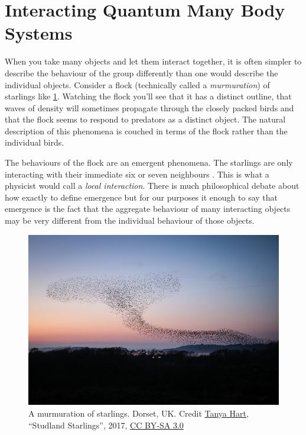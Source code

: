 \hypertarget{interacting-quantum-many-body-systems}{%
\section{Interacting Quantum Many Body Systems}\label{interacting-quantum-many-body-systems}}

When you take many objects and let them interact together, it is often simpler to describe the behaviour of the group differently than one would describe the individual objects. Consider a flock (technically called a \emph{murmuration}) of starlings like \cref{fig:Studland_Starlings}. Watching the flock you'll see that it has a distinct outline, that waves of density will sometimes propagate through the closely packed birds and that the flock seems to respond to predators as a distinct object. The natural description of this phenomena is couched in terms of the flock rather than the individual birds.

The behaviours of the flock are an emergent phenomena. The starlings are only interacting with their immediate six or seven neighbours \autocite{king2012murmurations,balleriniInteractionRulingAnimal2008}. This is what a physicist would call a \emph{local interaction}. There is much philosophical debate about how exactly to define emergence \autocite{andersonMoreDifferent1972,kivelsonDefiningEmergencePhysics2016} but for our purposes it enough to say that emergence is the fact that the aggregate behaviour of many interacting objects may be very different from the individual behaviour of those objects.

\hypertarget{fig:Studland_Starlings}{%
\begin{figure}
\centering
\includegraphics[width=1\textwidth,height=\textheight]{figure_code/intro_chapter/Studland_Starlings.jpeg}
\caption[{A murmuration of Starlings}]{A murmuration of starlings. Dorset, UK. Credit \href{twitter.com/arripay}{Tanya Hart}, ``Studland Starlings'', 2017, \href{creativecommons.org/licenses/by-sa/3.0/deed.en}{CC BY-SA 3.0}}
\label{fig:Studland_Starlings}
\end{figure}
}

